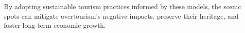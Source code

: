 \documentclass{mcmthesis}
\begin{document}
By adopting sustainable tourism practices informed by these models, the scenic spots can mitigate overtourism's negative impacts, preserve their heritage, and foster long-term economic growth.










\AImatter
\end{document}
